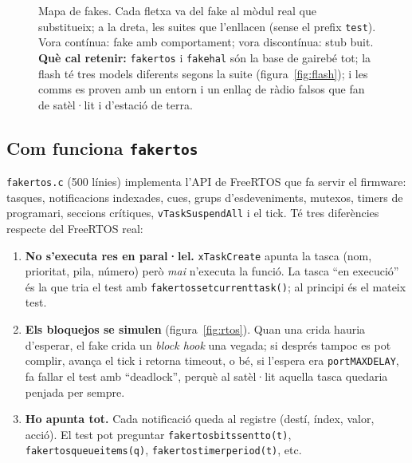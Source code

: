 \documentclass[11pt,a4paper]{article}
\DeclareRobustCommand{\_}{\textunderscore\allowbreak}
\newcommand{\cd}[1]{\texttt{#1}}
\newenvironment{slidefig}{\begin{landscape}\thispagestyle{plain}\begin{figure}[p]\centering}{\end{figure}\end{landscape}}
\begin{document}
\begin{slidefig}
\caption{Mapa de fakes. Cada fletxa va del fake al mòdul real que substitueix; a la dreta, les suites
que l'enllacen (sense el prefix \cd{test\_}). Vora contínua: fake amb comportament; vora discontínua:
stub buit. \textbf{Què cal retenir:} \cd{fake\_rtos} i \cd{fake\_hal} són la base de gairebé tot; la flash
té tres models diferents segons la suite (figura~\ref{fig:flash}); i les comms es proven amb un entorn
i un enllaç de ràdio falsos que fan de satèl·lit i d'estació de terra.}
\label{fig:fakes}
\end{slidefig}

\subsection{Com funciona \texorpdfstring{\cd{fake\_rtos}}{fake\_rtos}}

\cd{fake\_rtos.c} (500 línies) implementa l'API de FreeRTOS que fa servir el
firmware: tasques, notificacions indexades, cues, grups d'esdeveniments, mutexos,
timers de programari, seccions crítiques, \cd{vTaskSuspendAll} i el tick. Té tres
diferències respecte del FreeRTOS real:

\begin{enumerate}
\item \textbf{No s'executa res en paral·lel.} \cd{xTaskCreate} apunta la tasca (nom,
  prioritat, pila, número) però \emph{mai} n'executa la funció. La tasca ``en execució''
  és la que tria el test amb \cd{fake\_rtos\_set\_current\_task()}; al principi és el mateix test.
\item \textbf{Els bloquejos se simulen} (figura~\ref{fig:rtos}). Quan una crida hauria
  d'esperar, el fake crida un \emph{block hook} una vegada; si després tampoc es pot complir,
  avança el tick i retorna timeout, o bé, si l'espera era \cd{portMAX\_DELAY}, fa fallar el test
  amb ``deadlock'', perquè al satèl·lit aquella tasca quedaria penjada per sempre.
\item \textbf{Ho apunta tot.} Cada notificació queda al registre (destí, índex, valor, acció).
  El test pot preguntar \cd{fake\_rtos\_bits\_sent\_to(t)}, \cd{fake\_rtos\_queue\_items(q)},
  \cd{fake\_rtos\_timer\_period(t)}, etc.
\end{enumerate}
\end{document}
